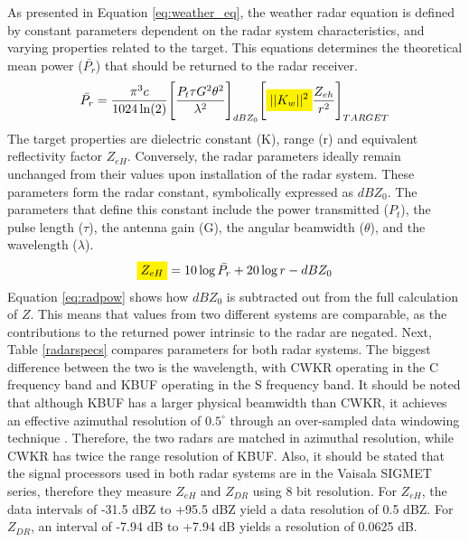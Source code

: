 As presented in Equation \ref{eq:weather_eq}, the weather radar equation is defined by constant parameters dependent on the radar system characteristics, and
varying properties related to the target. This equations determines the theoretical mean power ($\bar{P_r}$) that should be returned to the radar receiver.
\begin{equation}\label{eq:weather_eq}
\bar{P_r} = \frac{\pi^3c}{1024 \ln(2)} \Bigg[\frac{P_t \tau G^2 \theta^2}{\lambda^2}\Bigg]_{dBZ_0} \Bigg[\mathcolorbox{yellow} {||K_{w}||^{2}}\frac{Z_{eh}}{r^2}\Bigg]_{TARGET}
\end{equation}
The target properties are dielectric constant (K), range (r) and equivalent reflectivity factor $Z_{eH}$. Conversely, the radar parameters ideally remain
unchanged from their values upon installation of the radar system. These parameters form the radar constant, symbolically expressed as $dBZ_0$. The
parameters that define this constant include the power transmitted ($P_t$), the pulse length ($\tau$), the antenna gain (G), the angular beamwidth
($\theta$), and the wavelength ($\lambda$).
\begin{equation}\label{eq:radpow}
\mathcolorbox{yellow}{Z_{eH}} = 10 \log{\bar{P_r}} + 20 \log r - dBZ_0
\end{equation}
Equation \ref{eq:radpow} shows how $dBZ_0$ is subtracted out from the full calculation of $Z$. This means that values from two different systems are comparable, as the contributions to the returned power intrinsic to the radar are negated. Next, Table \ref{radarspecs} compares parameters for both
radar systems. The biggest difference between the two is the wavelength, with CWKR operating in the C frequency band and KBUF operating in the S frequency
band. It should be noted that although KBUF has a larger physical beamwidth than CWKR, it achieves an effective azimuthal resolution of $0.5^{\circ}$ through
an over-sampled data windowing technique \citep{Torres2007}. Therefore, the two radars are matched in azimuthal resolution, while CWKR has twice the range
resolution of KBUF. Also, it should be stated that the signal processors used in both radar systems are in the
Vaisala SIGMET series, therefore they measure
$Z_{eH}$ and $Z_{DR}$ using 8 bit resolution. For $Z_{eH}$, the data intervals of -31.5 dBZ to +95.5 dBZ yield a
data resolution of 0.5 dBZ.  For $Z_{DR}$, an interval of -7.94 dB to +7.94 dB yields a resolution of 0.0625 dB.

